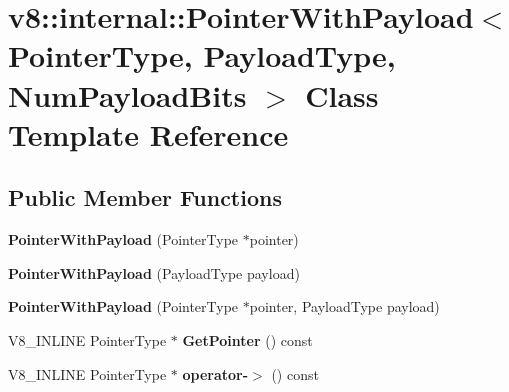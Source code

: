 \hypertarget{classv8_1_1internal_1_1PointerWithPayload}{}\section{v8\+:\+:internal\+:\+:Pointer\+With\+Payload$<$ Pointer\+Type, Payload\+Type, Num\+Payload\+Bits $>$ Class Template Reference}
\label{classv8_1_1internal_1_1PointerWithPayload}
\subsection*{Public Member Functions}
\begin{DoxyCompactItemize}
\item 
\mbox{\label{classv8_1_1internal_1_1PointerWithPayload_a506a324f8ee45e5bcc7cc549442fe95d}} 
{\bfseries Pointer\+With\+Payload} (Pointer\+Type $\ast$pointer)
\item 
\mbox{\label{classv8_1_1internal_1_1PointerWithPayload_a984144ae3ae01ccd0e68aa28b7642f90}} 
{\bfseries Pointer\+With\+Payload} (Payload\+Type payload)
\item 
\mbox{\label{classv8_1_1internal_1_1PointerWithPayload_a00343f7e8d7e983c4535bcd8eb7a3644}} 
{\bfseries Pointer\+With\+Payload} (Pointer\+Type $\ast$pointer, Payload\+Type payload)
\item 
\mbox{\label{classv8_1_1internal_1_1PointerWithPayload_a066ceeae6fdb0322e59f7c1a51bb1825}} 
V8\+\_\+\+I\+N\+L\+I\+NE Pointer\+Type $\ast$ {\bfseries Get\+Pointer} () const
\item 
\mbox{\label{classv8_1_1internal_1_1PointerWithPayload_a2f25760af326b0002a3d8c8fd07c0148}} 
V8\+\_\+\+I\+N\+L\+I\+NE Pointer\+Type $\ast$ {\bfseries operator-\/$>$} () const
\item 
\mbox{\label{classv8_1_1internal_1_1PointerWithPayload_af4641269e0c9389f15ee547ea33a3e71}} 

\end{DoxyCompactItemize}
